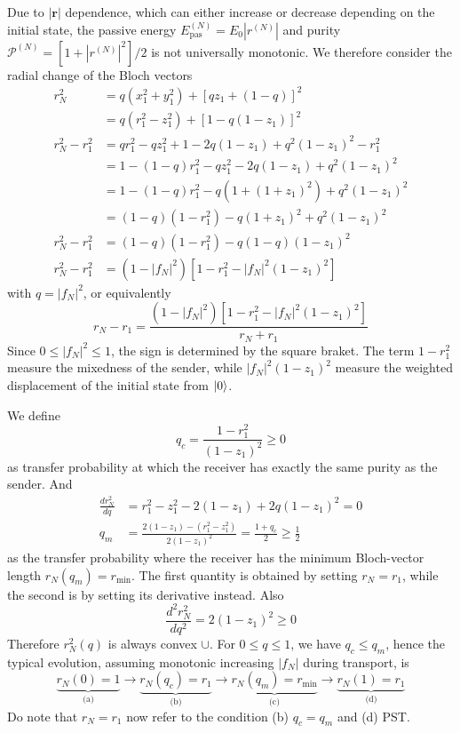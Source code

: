 \documentclass[../../../main.tex]{subfiles}
\begin{document}
Due to $|\mathbf{r}|$ dependence, which can either increase or decrease depending on the initial state, the passive energy $E_\mathrm{pas}^{(N)} = E_0|r^{(N)}|$ and purity $\mathcal{P}^{(N)} = [1+|r^{(N)}|^2]/2$ is not universally monotonic.
We therefore consider the radial change of the Bloch vectors
\begin{align*}
  r_N^2
   & =  q(x_1^2+y_1^2)+[qz_1+(1-q)]^2                       \\
   & =  q(r_1^2-z_1^2)+[1-q(1-z_1)]^2                       \\
  r_N^2 -r_1^2
   & = qr_1^2-qz_1^2 + 1-2q(1-z_1) +q^2(1-z_1)^2-r_1^2      \\
   & = 1 - (1-q)r_1^2-qz_1^2 -2q(1-z_1) +q^2(1-z_1)^2       \\
   & = 1 - (1-q)r_1^2-q(1+(1+z_1)^2) +q^2(1-z_1)^2          \\
   & =  (1-q)(1-r_1^2)-q(1+z_1)^2 +q^2(1-z_1)^2             \\
  r_N^2-r_1^2
   & = (1-q)(1-r_1^2) - q(1-q)(1-z_1)^2                     \\
  r_N^2-r_1^2
   & =  (1-|f_N|^2)\left[ 1-r_1^2- |f_N|^2(1-z_1)^2 \right]
\end{align*}
with $q=|f_N|^2$, or equivalently
\begin{equation*}
  r_N-r_1 =
  \frac{  (1-|f_N|^2)\left[ 1-r_1^2- |f_N|^2(1-z_1)^2 \right]  }{r_N+r_1}
\end{equation*}
Since $0\leq |f_N|^2 \leq 1$, the sign is determined by the square braket.
The term $1-r_1^2$ measure the mixedness of the sender, while $|f_N|^2(1-z_1)^2$ measure the weighted displacement of the initial state from $\ket{0}$.

We define 
\begin{equation*}
 q_c= \frac{1-r_1^2}{(1-z_1)^2}\geq 0
\end{equation*}
as transfer probability at which the receiver has exactly the same purity as the sender.
And 
\begin{align*}
\frac{d r_N^2}{dq} 
& =  r_1^2-z_1^2-2(1-z_1) + 2q(1-z_1)^2 =0\\
q_m & = 
\frac{ 2(1-z_1)-(r_1^2-z_1^2) }{ 2(1-z_1)^2 } = \frac{1+q_c }{2} \geq \frac{1 }{2}
\end{align*}
as the transfer probability where the receiver has the minimum Bloch-vector length $r_N(q_m) = r_\text{min}$.
The first quantity is obtained by setting $r_N=r_1$, while the second is by setting its derivative instead.
Also 
\begin{equation*}
\frac{d^2 r_N^2}{dq^2} = 2(1-z_1)^2\ge0
\end{equation*}
Therefore \(r_N^2(q)\) is always convex $\cup$.
For $0\leq q \leq1$, we have $q_c\leq q_m$, hence the typical evolution, assuming monotonic increasing $|f_N|$ during transport, is
\begin{equation*}
  \underbrace{r_N(0)=1}_{\text{(a)}} \longrightarrow 
  \underbrace{r_N(q_c)=r_1}_{\text{(b)}} \longrightarrow 
  \underbrace{r_N(q_m)=r_{\min}}_\text{(c)} \longrightarrow 
  \underbrace{r_N(1)=r_1}_\text{(d)}
\end{equation*}
Do note that $r_N=r_1$ now refer to the condition (b) $q_c=q_m$ and (d) PST.
\end{document}
